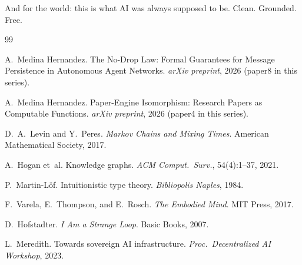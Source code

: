\documentclass[12pt]{article}
\begin{document}
And for the world: this is what AI was always supposed to be.  Clean.
Grounded. Free.


\begin{thebibliography}{99}

A.~Medina Hernandez.
\newblock The No-Drop Law: Formal Guarantees for Message Persistence in
  Autonomous Agent Networks.
\newblock \emph{arXiv preprint}, 2026 (paper8 in this series).

A.~Medina Hernandez.
\newblock Paper-Engine Isomorphism: Research Papers as Computable Functions.
\newblock \emph{arXiv preprint}, 2026 (paper4 in this series).

D.~A.~Levin and Y.~Peres.
\newblock \emph{Markov Chains and Mixing Times}.
\newblock American Mathematical Society, 2017.

A.~Hogan et~al.
\newblock Knowledge graphs.
\newblock \emph{ACM Comput.\ Surv.}, 54(4):1--37, 2021.

P.~Martin-L\"of.
\newblock Intuitionistic type theory.
\newblock \emph{Bibliopolis Naples}, 1984.

F.~Varela, E.~Thompson, and E.~Rosch.
\newblock \emph{The Embodied Mind}.
\newblock MIT Press, 2017.

D.~Hofstadter.
\newblock \emph{I Am a Strange Loop}.
\newblock Basic Books, 2007.

L.~Meredith.
\newblock Towards sovereign AI infrastructure.
\newblock \emph{Proc.\ Decentralized AI Workshop}, 2023.

\end{thebibliography}
\end{document}
